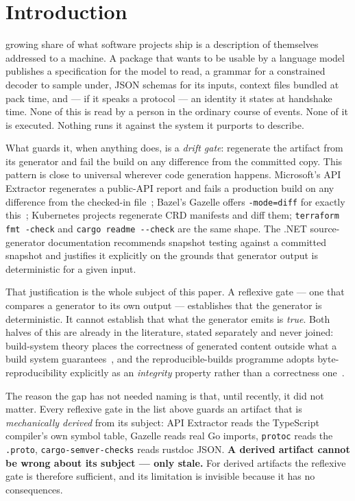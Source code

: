\documentclass[10pt,journal,compsoc]{IEEEtran}
\begin{document}
\section{Introduction}\label{sec:intro}

 growing share of what software projects ship is a description of
themselves addressed to a machine. A package that wants to be usable by a language
model publishes a specification for the model to read, a grammar for a constrained
decoder to sample under, JSON schemas for its inputs, context files bundled at pack
time, and --- if it speaks a protocol --- an identity it states at handshake time.
None of this is read by a person in the ordinary course of events. None of it is
executed. Nothing runs it against the system it purports to describe.

What guards it, when anything does, is a \emph{drift gate}: regenerate the artifact
from its generator and fail the build on any difference from the committed copy.
This pattern is close to universal wherever code generation happens. Microsoft's API
Extractor regenerates a public-API report and fails a production build on any
difference from the checked-in file~\cite{api_extractor}; Bazel's Gazelle offers
\texttt{-mode=diff} for exactly this~\cite{bazel_gazelle}; Kubernetes projects
regenerate CRD manifests and diff them; \texttt{terraform fmt -check} and
\texttt{cargo readme -{}-check} are the same shape. The .NET source-generator
documentation recommends snapshot testing against a committed snapshot and justifies
it explicitly on the grounds that generator output is deterministic for a given
input.

That justification is the whole subject of this paper. A reflexive gate --- one that
compares a generator to its own output --- establishes that the generator is
deterministic. It cannot establish that what the generator emits is \emph{true}. Both
halves of this are already in the literature, stated separately and never joined:
build-system theory places the correctness of generated content outside what a build
system guarantees~\cite{mokhov2020buildsystems}, and the reproducible-builds programme
adopts byte-reproducibility explicitly as an \emph{integrity} property rather than a
correctness one~\cite{lamb2022reproducible}.

The reason the gap has not needed naming is that, until recently, it did not matter.
Every reflexive gate in the list above guards an artifact that is \emph{mechanically
derived} from its subject: API Extractor reads the TypeScript compiler's own symbol
table, Gazelle reads real Go imports, \texttt{protoc} reads the \texttt{.proto},
\texttt{cargo-semver-checks} reads rustdoc JSON. \textbf{A derived artifact cannot be
wrong about its subject --- only stale.} For derived artifacts the reflexive gate is
therefore sufficient, and its limitation is invisible because it has no consequences.
\end{document}
